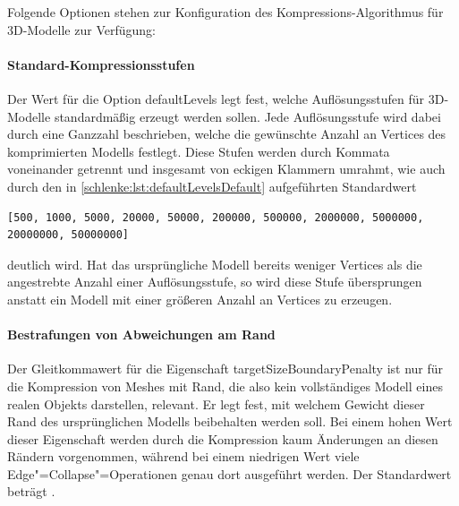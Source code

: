 Folgende Optionen stehen zur Konfiguration des Kompressions-Algorithmus für 3D-Modelle zur Verfügung:

\paragraph{Standard-Kompressionsstufen} Der Wert für die Option {\ttfamily default\-Levels} legt fest, welche Auflösungsstufen für 3D-Modelle standardmäßig erzeugt werden sollen. Jede Auflösungsstufe wird dabei durch eine Ganzzahl beschrieben, welche die gewünschte Anzahl an Vertices des komprimierten Modells festlegt. Diese Stufen werden durch Kommata voneinander getrennt und insgesamt von eckigen Klammern umrahmt, wie auch durch den in \autoref{schlenke:lst:defaultLevelsDefault} aufgeführten Standardwert 
\begin{lstlisting}[caption={Standardwert für die Konfigurationsoption {\ttfamily default\-Levels}},label=schlenke:lst:defaultLevelsDefault]
	[500, 1000, 5000, 20000, 50000, 200000, 500000, 2000000, 5000000, 20000000, 50000000]
\end{lstlisting}
 deutlich wird. Hat das ursprüngliche Modell bereits weniger Vertices als die angestrebte Anzahl einer Auflösungsstufe, so wird diese Stufe übersprungen anstatt ein Modell mit einer größeren Anzahl an Vertices zu erzeugen.

\paragraph{Bestrafungen von Abweichungen am Rand} Der Gleitkommawert für die Eigenschaft {\ttfamily target\-Size\-Boundary\-Penalty} ist nur für die Kompression von Meshes mit Rand, die also kein vollständiges Modell eines realen Objekts darstellen, relevant. Er legt fest, mit welchem Gewicht dieser Rand des ursprünglichen Modells beibehalten werden soll. Bei einem hohen Wert dieser Eigenschaft werden durch die Kompression kaum Änderungen an diesen Rändern vorgenommen, während bei einem niedrigen Wert viele Edge"=Collapse"=Operationen genau dort ausgeführt werden. Der Standardwert beträgt {}.

